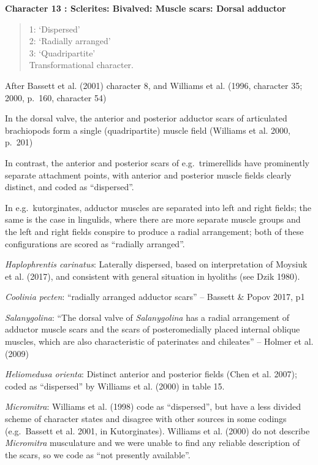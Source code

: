 \documentclass[]{book}
\theoremstyle{definition}
\theoremstyle{definition}
\theoremstyle{definition}
\theoremstyle{remark}
\begin{document}
\textbf{Character 13 : Sclerites: Bivalved: Muscle scars: Dorsal
adductor }

\begin{quote}
1: `Dispersed'\\
2: `Radially arranged'\\
3: `Quadripartite'\\
Transformational character.
\end{quote}

After Bassett et al. (2001) character 8, and Williams et al. (1996,
character 35; 2000, p.~160, character 54)

In the dorsal valve, the anterior and posterior adductor scars of
articulated brachiopods form a single (quadripartite) muscle field
(Williams et al. 2000, p.~201)

In contrast, the anterior and posterior scars of e.g.~trimerellids have
prominently separate attachment points, with anterior and posterior
muscle fields clearly distinct, and coded as ``dispersed''.

In e.g.~kutorginates, adductor muscles are separated into left and right
fields; the same is the case in lingulids, where there are more separate
muscle groups and the left and right fields conspire to produce a radial
arrangement; both of these configurations are scored as ``radially
arranged''.

\emph{Haplophrentis carinatus}: Laterally dispersed, based on
interpretation of Moysiuk et al. (2017), and consistent with general
situation in hyoliths (see Dzik 1980).

\emph{Coolinia pecten}: ``radially arranged adductor scars'' -- Bassett
\& Popov 2017, p1

\emph{Salanygolina}: ``The dorsal valve of \emph{Salanygolina} has a
radial arrangement of adductor muscle scars and the scars of
posteromedially placed internal oblique muscles, which are also
characteristic of paterinates and chileates'' -- Holmer et al. (2009)

\emph{Heliomedusa orienta}: Distinct anterior and posterior fields (Chen
et al. 2007); coded as ``dispersed'' by Williams et al. (2000) in table
15.

\emph{Micromitra}: Williams et al. (1998) code as ``dispersed'', but
have a less divided scheme of character states and disagree with other
sources in some codings (e.g.~Bassett et al. 2001, in Kutorginates).
Williams et al. (2000) do not describe \emph{Micromitra} musculature and
we were unable to find any reliable description of the scars, so we code
as ``not presently available''.
\end{document}
